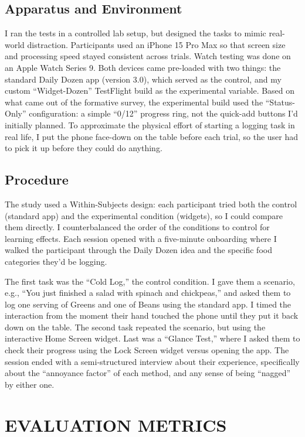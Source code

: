 \documentclass[10pt,twocolumn]{article}
\begin{document}
\subsection{Apparatus and Environment}

I ran the tests in a controlled lab setup, but designed the tasks to mimic real-world distraction. Participants used an iPhone 15 Pro Max so that screen size and processing speed stayed consistent across trials. Watch testing was done on an Apple Watch Series 9. Both devices came pre-loaded with two things: the standard Daily Dozen app (version 3.0), which served as the control, and my custom ``Widget-Dozen'' TestFlight build as the experimental variable. Based on what came out of the formative survey, the experimental build used the ``Status-Only'' configuration: a simple ``0/12'' progress ring, not the quick-add buttons I'd initially planned. To approximate the physical effort of starting a logging task in real life, I put the phone face-down on the table before each trial, so the user had to pick it up before they could do anything.

\subsection{Procedure}

The study used a Within-Subjects design: each participant tried both the control (standard app) and the experimental condition (widgets), so I could compare them directly. I counterbalanced the order of the conditions to control for learning effects. Each session opened with a five-minute onboarding where I walked the participant through the Daily Dozen idea and the specific food categories they'd be logging.

The first task was the ``Cold Log,'' the control condition. I gave them a scenario, e.g., ``You just finished a salad with spinach and chickpeas,'' and asked them to log one serving of Greens and one of Beans using the standard app. I timed the interaction from the moment their hand touched the phone until they put it back down on the table. The second task repeated the scenario, but using the interactive Home Screen widget. Last was a ``Glance Test,'' where I asked them to check their progress using the Lock Screen widget versus opening the app. The session ended with a semi-structured interview about their experience, specifically about the ``annoyance factor'' of each method, and any sense of being ``nagged'' by either one.

\section{EVALUATION METRICS}
\end{document}
